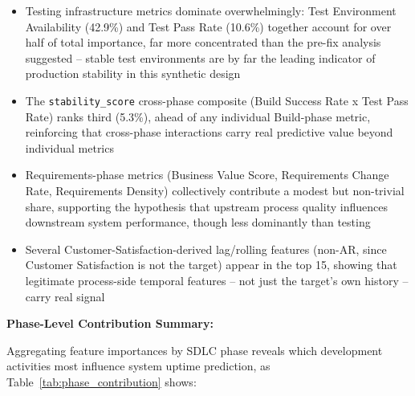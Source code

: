\documentclass[technologies,article,submit,pdftex,moreauthors]{Definitions/mdpi}
\begin{document}
\begin{itemize}
\item
  Testing infrastructure metrics dominate overwhelmingly: Test
  Environment Availability (42.9\%) and Test Pass Rate (10.6\%) together
  account for over half of total importance, far more concentrated than
  the pre-fix analysis suggested -- stable test environments are by far
  the leading indicator of production stability in this synthetic design
\item
  The \texttt{stability\_score} cross-phase composite (Build Success
  Rate x Test Pass Rate) ranks third (5.3\%), ahead of any individual
  Build-phase metric, reinforcing that cross-phase interactions carry
  real predictive value beyond individual metrics
\item
  Requirements-phase metrics (Business Value Score, Requirements Change
  Rate, Requirements Density) collectively contribute a modest but
  non-trivial share, supporting the hypothesis that upstream process
  quality influences downstream system performance, though less
  dominantly than testing
\item
  Several Customer-Satisfaction-derived lag/rolling features (non-AR,
  since Customer Satisfaction is not the target) appear in the top 15,
  showing that legitimate process-side temporal features -- not just the
  target's own history -- carry real signal
\end{itemize}

\textbf{Phase-Level Contribution Summary:}

Aggregating feature importances by SDLC phase reveals which development
activities most influence system uptime prediction, as Table~\ref{tab:phase_contribution} shows:
\end{document}
